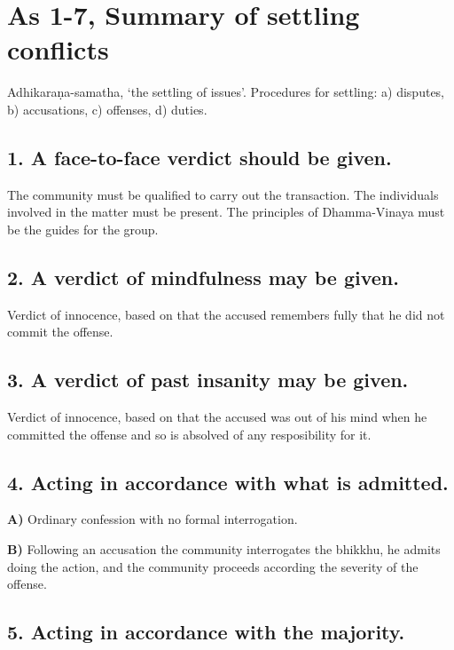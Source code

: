 \clearpage

\section{As 1-7, Summary of settling conflicts}

Adhikaraṇa-samatha, `the settling of issues'. Procedures for settling:
a) disputes, b) accusations, c) offenses, d) duties.

\subsection{1. A face-to-face verdict should be given.}

The community must be qualified to carry out the transaction. The
individuals involved in the matter must be present. The principles of
Dhamma-Vinaya must be the guides for the group.

\subsection{2. A verdict of mindfulness may be given.}

Verdict of innocence, based on that the accused remembers fully that he
did not commit the offense.

\subsection{3. A verdict of past insanity may be given.}

Verdict of innocence, based on that the accused was out of his mind when
he committed the offense and so is absolved of any resposibility for it.

\subsection{4. Acting in accordance with what is admitted.}

\textbf{A)} Ordinary confession with no formal interrogation.

\textbf{B)} Following an accusation the community interrogates the
bhikkhu, he admits doing the action, and the community proceeds
according the severity of the offense.

\subsection{5. Acting in accordance with the majority.}

